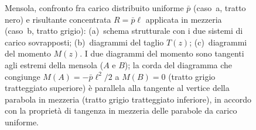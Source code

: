 \begin{figure}[htbp]
{
			}
			\caption{Mensola, confronto fra carico distribuito uniforme $\bar{p}$
				(caso~a, tratto nero) e risultante concentrata $R = \bar{p}\ell$ applicata
				in mezzeria (caso~b, tratto grigio):
				(a)~schema strutturale con i due sistemi di carico sovrapposti;
				(b)~diagrammi del taglio $T(z)$;
				(c)~diagrammi del momento $M(z)$. I due diagrammi del momento sono
				tangenti agli estremi della mensola ($A$ e $B$); la corda del
				diagramma che congiunge $M(A) = -\bar p\ell^2/2$ a $M(B) = 0$
				(tratto grigio tratteggiato superiore) è parallela alla tangente
				al vertice della parabola in mezzeria (tratto grigio tratteggiato
				inferiore), in accordo con la proprietà di tangenza in mezzeria
				delle parabole da carico uniforme.}
			\label{fig:stat_confronto_02}
		\end{figure}
